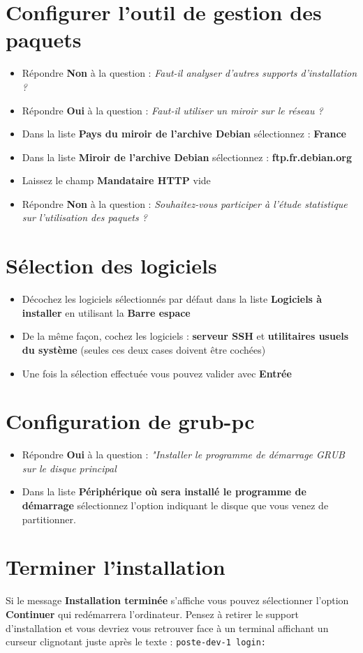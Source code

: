 \section{Configurer l'outil de gestion des paquets}
\begin{itemize}
	\item Répondre \textbf{Non} à la question : \textit{Faut-il analyser d'autres supports d'installation ?}
	\item Répondre \textbf{Oui} à la question : \textit{Faut-il utiliser un miroir sur le réseau ?}
	\item Dans la liste \textbf{Pays du miroir de l'archive Debian} sélectionnez : \textbf{France}
	\item Dans la liste \textbf{Miroir de l'archive Debian} sélectionnez : \textbf{ftp.fr.debian.org}
	\item Laissez le champ \textbf{Mandataire HTTP} vide
	\item Répondre \textbf{Non} à la question : \textit{Souhaitez-vous participer à l'étude statistique sur l'utilisation des paquets ?}
\end{itemize}

\section{Sélection des logiciels}
\begin{itemize}
	\item Décochez les logiciels sélectionnés par défaut dans la liste \textbf{Logiciels à installer} en utilisant la \textbf{Barre espace}
	\item De la même façon, cochez les logiciels : \textbf{serveur SSH} et \textbf{utilitaires usuels du système} (seules ces deux cases doivent être cochées)
	\item Une fois la sélection effectuée vous pouvez valider avec \textbf{Entrée}
\end{itemize}

\section{Configuration de grub-pc}
\begin{itemize}
	\item Répondre \textbf{Oui} à la question : \textit{"Installer le programme de démarrage GRUB sur le disque principal}
	\item Dans la liste \textbf{Périphérique où sera installé le programme de démarrage} sélectionnez l'option indiquant le disque que vous venez de partitionner.
\end{itemize}

\section{Terminer l'installation}
Si le message \textbf{Installation terminée} s'affiche vous pouvez sélectionner l'option \textbf{Continuer} qui redémarrera l'ordinateur. Pensez à retirer le support d'installation et vous devriez vous retrouver face à un terminal affichant un curseur clignotant juste après le texte : \texttt{poste-dev-1 login:}